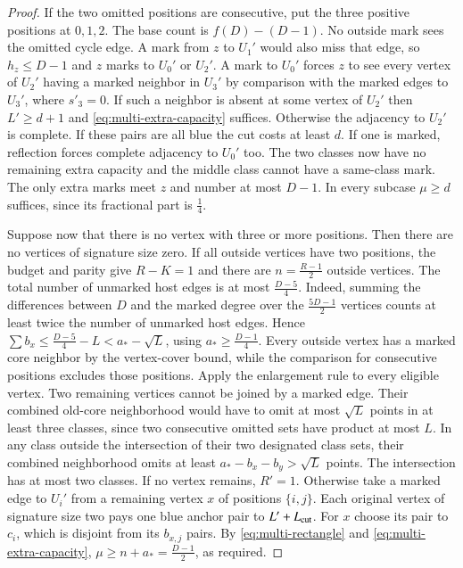 \documentclass[preprint,11pt,numbers]{elsarticle-arxiv}
\numberwithin{equation}{section}
\theoremstyle{definition}
\begin{document}
\begin{proof}
If the two omitted positions are consecutive, put the three
positive positions at $0,1,2$. The base count is $f(D)-(D-1)$.
No outside mark sees the omitted cycle edge. A mark from $z$ to
$U_1'$ would also miss that edge, so $h_z\le D-1$ and $z$ marks
to $U_0'$ or $U_2'$. A mark to $U_0'$ forces $z$ to see every
vertex of $U_2'$ having a marked neighbor in $U_3'$ by comparison
with the marked edges to $U_3'$, where $s'_3=0$. If such a
neighbor is absent at some vertex of $U_2'$ then $L'\ge d+1$
and \eqref{eq:multi-extra-capacity} suffices. Otherwise the
adjacency to $U_2'$ is complete. If these pairs are all blue the
cut costs at least $d$. If one is marked, reflection forces
complete adjacency to $U_0'$ too. The two classes now have no
remaining extra capacity and the middle class cannot have a
same-class mark. The only extra marks meet $z$ and number at most
$D-1$. In every subcase $\mu\ge d$ suffices, since its fractional
part is $\frac{1}{4}$.

Suppose now that there is no vertex with three or more positions.
Then there are no vertices of signature size zero. If all outside vertices have
two positions, the budget and parity give $R-K=1$ and there are
$n=\frac{R-1}{2}$ outside vertices. The total number of unmarked host
edges is at most $\frac{D-5}{4}$. Indeed, summing the differences
between $D$ and the marked degree over the $\frac{5D-1}{2}$ vertices
counts at least twice the number of unmarked host edges.
Hence $\sum b_x\le \frac{D-5}{4}-L<a_*-\sqrt L$,
using $a_*\ge\frac{D-1}{4}$. Every outside vertex has a marked core
neighbor by the vertex-cover bound, while the comparison for
consecutive positions excludes those positions. Apply the enlargement
rule to every eligible vertex. Two remaining vertices cannot be joined
by a marked edge.
Their combined old-core neighborhood would have to omit at most
$\sqrt L$ points in at least three classes, since two consecutive
omitted sets have product at most $L$. In any class outside the
intersection of their two designated class sets, their combined
neighborhood omits at least $a_*-b_x-b_y>\sqrt L$ points. The
intersection has at most two classes. If no vertex remains, $R'=1$.
Otherwise take a marked edge to $U_i'$ from a remaining vertex $x$
of positions $\{i,j\}$. Each original vertex of signature size two pays
one blue anchor pair to $L'+L_{\rm cut}$. For $x$ choose its pair
to $c_i$, which is disjoint from its $b_{x,j}$ pairs. By
\eqref{eq:multi-rectangle} and \eqref{eq:multi-extra-capacity},
$\mu\ge n+a_*=\frac{D-1}{2}$, as required.


\end{proof}
\end{document}
